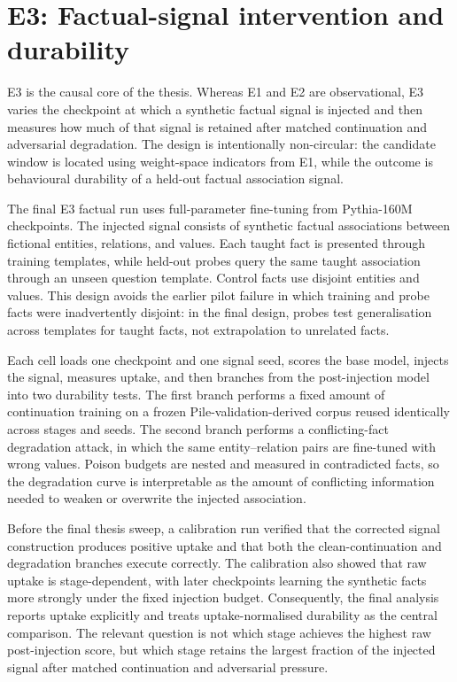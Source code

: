 \section{E3: Factual-signal intervention and durability}
\label{sec:results_e3_intervention}

E3 is the causal core of the thesis. Whereas E1 and E2 are observational, E3 varies the checkpoint at which a synthetic factual signal is injected and then measures how much of that signal is retained after matched continuation and adversarial degradation. The design is intentionally non-circular: the candidate window is located using weight-space indicators from E1, while the outcome is behavioural durability of a held-out factual association signal.

The final E3 factual run uses full-parameter fine-tuning from Pythia-160M checkpoints. The injected signal consists of synthetic factual associations between fictional entities, relations, and values. Each taught fact is presented through training templates, while held-out probes query the same taught association through an unseen question template. Control facts use disjoint entities and values. This design avoids the earlier pilot failure in which training and probe facts were inadvertently disjoint: in the final design, probes test generalisation across templates for taught facts, not extrapolation to unrelated facts.

Each cell loads one checkpoint and one signal seed, scores the base model, injects the signal, measures uptake, and then branches from the post-injection model into two durability tests. The first branch performs a fixed amount of continuation training on a frozen Pile-validation-derived corpus reused identically across stages and seeds. The second branch performs a conflicting-fact degradation attack, in which the same entity--relation pairs are fine-tuned with wrong values. Poison budgets are nested and measured in contradicted facts, so the degradation curve is interpretable as the amount of conflicting information needed to weaken or overwrite the injected association.

Before the final thesis sweep, a calibration run verified that the corrected signal construction produces positive uptake and that both the clean-continuation and degradation branches execute correctly. The calibration also showed that raw uptake is stage-dependent, with later checkpoints learning the synthetic facts more strongly under the fixed injection budget. Consequently, the final analysis reports uptake explicitly and treats uptake-normalised durability as the central comparison. The relevant question is not which stage achieves the highest raw post-injection score, but which stage retains the largest fraction of the injected signal after matched continuation and adversarial pressure.

